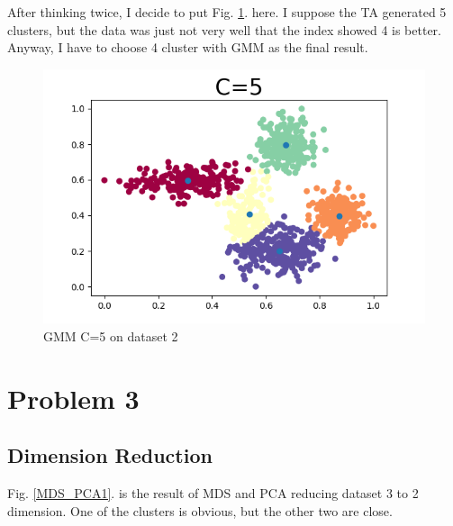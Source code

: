 \documentclass[conference]{IEEEtran}
\begin{document}
After thinking twice, I decide to put Fig. \ref{pity}. here. I suppose the TA generated 5 clusters, but the data was just not very well that the index showed 4 is better. Anyway, I have to choose 4 cluster with GMM as the final result.

\begin{figure}[htbp]
	\centerline{\includegraphics[scale=0.5]{g=5.png}}
	\caption{GMM C=5 on dataset 2}
	\label{pity}
\end{figure}

\section{\textbf{Problem 3}}
\subsection{Dimension Reduction}
	Fig. \ref{MDS_PCA1}. is the result of MDS and PCA reducing dataset 3 to 2 dimension. One of the clusters is obvious, but the other two are close.
\end{document}
